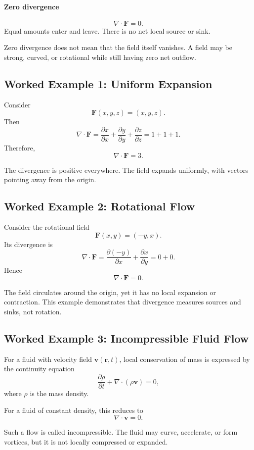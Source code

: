 \paragraph{Zero divergence}
\[
\nabla\cdot\mathbf F=0.
\]
Equal amounts enter and leave. There is no net local source or sink.

Zero divergence does not mean that the field itself vanishes. A field may be
strong, curved, or rotational while still having zero net outflow.

\subsection{Worked Example 1: Uniform Expansion}

Consider
\[
\mathbf F(x,y,z)=(x,y,z).
\]
Then
\[
\nabla\cdot\mathbf F
=
\frac{\partial x}{\partial x}
+
\frac{\partial y}{\partial y}
+
\frac{\partial z}{\partial z}
=
1+1+1.
\]
Therefore,
\[
\boxed{
\nabla\cdot\mathbf F=3.
}
\]

The divergence is positive everywhere. The field expands uniformly, with
vectors pointing away from the origin.

\subsection{Worked Example 2: Rotational Flow}

Consider the rotational field
\[
\mathbf F(x,y)=(-y,x).
\]
Its divergence is
\[
\nabla\cdot\mathbf F
=
\frac{\partial(-y)}{\partial x}
+
\frac{\partial x}{\partial y}
=
0+0.
\]
Hence
\[
\boxed{
\nabla\cdot\mathbf F=0.
}
\]

The field circulates around the origin, yet it has no local expansion or
contraction. This example demonstrates that divergence measures sources and
sinks, not rotation.

\subsection{Worked Example 3: Incompressible Fluid Flow}

For a fluid with velocity field $\mathbf v(\mathbf r,t)$, local conservation of
mass is expressed by the continuity equation
\[
\frac{\partial\rho}{\partial t}
+
\nabla\cdot(\rho\mathbf v)
=
0,
\]
where $\rho$ is the mass density.

For a fluid of constant density, this reduces to
\[
\boxed{
\nabla\cdot\mathbf v=0.
}
\]

Such a flow is called incompressible. The fluid may curve, accelerate, or form
vortices, but it is not locally compressed or expanded.

